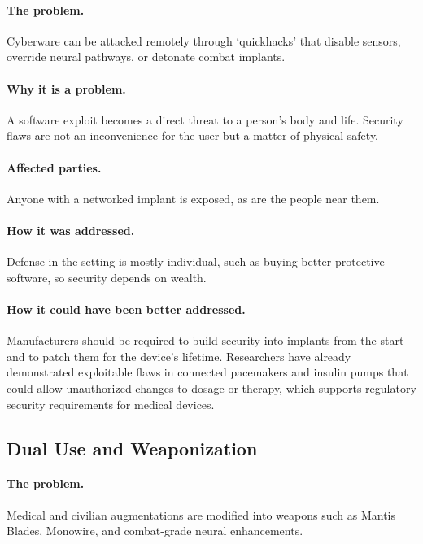 \documentclass{article}%
\begin{document}
\paragraph{The problem.}
Cyberware can be attacked remotely through `quickhacks' that disable sensors, override neural pathways, or detonate combat implants.

\paragraph{Why it is a problem.}
A software exploit becomes a direct threat to a person's body and life. Security flaws are not an inconvenience for the user but a matter of physical safety.

\paragraph{Affected parties.}
Anyone with a networked implant is exposed, as are the people near them.

\paragraph{How it was addressed.}
Defense in the setting is mostly individual, such as buying better protective software, so security depends on wealth.

\paragraph{How it could have been better addressed.}
Manufacturers should be required to build security into implants from the start and to patch them for the device's lifetime. Researchers have already demonstrated exploitable flaws in connected pacemakers and insulin pumps that could allow unauthorized changes to dosage or therapy, which supports regulatory security requirements for medical devices.

\subsection{Dual Use and Weaponization}

\paragraph{The problem.}
Medical and civilian augmentations are modified into weapons such as Mantis Blades, Monowire, and combat-grade neural enhancements.
\end{document}
